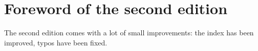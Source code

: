 \section*{Foreword of the second edition}

The second edition comes with a lot of small improvements: the index has been improved, typos have
been fixed.





